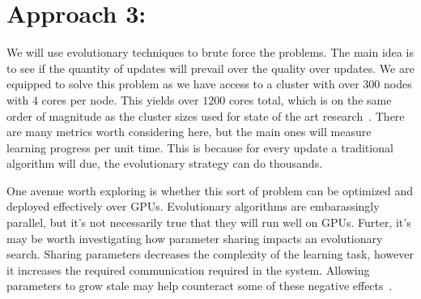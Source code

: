 
\section{Approach 3: }
We will use evolutionary techniques to brute force the problems.
The main idea is to see if the quantity of updates will prevail over the quality over updates.
We are equipped to solve this problem as we have access to a cluster with over $300$ nodes with $4$ cores per node.
This yields over $1200$ cores total, which is on the same order of magnitude as the cluster sizes used for state of the art research~\cite{salimans2017evolution}.
There are many metrics worth considering here, but the main ones will measure learning progress per unit time.
This is because for every update a traditional algorithm will due, the evolutionary strategy can do thousands.

One avenue worth exploring is whether this sort of problem can be optimized and deployed effectively over GPUs.
Evolutionary algorithms are embarassingly parallel, but it's not necessarily true that they will run well on GPUs.
Furter, it’s may be worth investigating how parameter sharing impacts an evolutionary search.
Sharing parameters decreases the complexity of the learning task, however it increases the required communication required in the system.
Allowing parameters to grow stale may help counteract some of these negative effects~\cite{cui2014exploiting}.
\label{sec:direction3}



